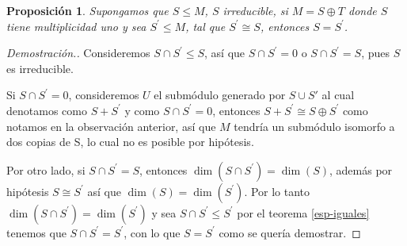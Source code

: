 \documentclass[12pt]{book}
\newtheorem{proposition}[theorem]{Proposición}
\theoremstyle{definition}
\newcounter{in}
\newcounter{ini}
\begin{document}
\begin{proposition}
  \label{modulos-iguales}
  Supongamos que $S\leq M$, $S$ irreducible, si $M=S\oplus T$ donde $S$
  tiene multiplicidad uno y sea $S^{'}\leq M$, tal que $S^{'}\cong S$, entonces $S=S^{'}$.
\end{proposition}

\begin{proof}[Demostración.]
  Consideremos $S\cap S^{'}\leq S$, así que $S\cap S^{'}=0$ o $S\cap
  S^{'}=S$, pues $S$ es irreducible.

  Si $S\cap S^{'}=0$, consideremos $U$ el submódulo generado por $S\cup S'$ al cual
  denotamos como $S+S^{'}$ y como $S\cap S^{'}=0$, entonces
  $S+S^{'}\cong S\oplus S^{'}$ como notamos en la observación anterior,
  así que $M$ tendría un submódulo isomorfo a dos copias de S, lo cual
  no es posible por hipótesis. 
  
 Por otro lado, si $S\cap S^{'}=S$, entonces $\dim (S\cap
 S^{'})=\dim(S)$, además por hipótesis $S\cong S^{'}$ así que
 $\dim(S)=\dim(S^{'})$. Por lo tanto $\dim(S\cap S^{'})=\dim(S^{'})$ y
 sea $S\cap S^{'}\leq S^{'}$ por el teorema \ref{esp-iguales} tenemos
 que $S\cap S^{'}=S^{'}$, con lo que $S=S^{'}$ como se quería demostrar.
\end{proof}
\end{document}
